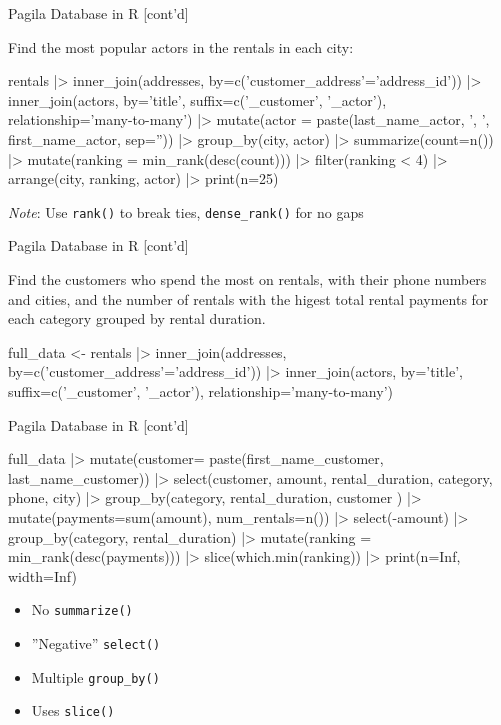 \documentclass[ignorenonframetext,xcolor=x11names]{beamer}
\begin{document}
\begin{frame}[label=full,fragile]{Pagila Database in R \small [cont'd]}

Find the most popular actors in the rentals in each city:

\scriptsize
\begin{Rcode}
rentals |> 
   inner_join(addresses,
       by=c('customer_address'='address_id')) |>
   inner_join(actors,
       by='title',
       suffix=c('_customer', '_actor'),
       relationship='many-to-many') |>
   mutate(actor = 
       paste(last_name_actor, ', ', 
       first_name_actor, sep='')) |>
   group_by(city, actor) |>
   summarize(count=n()) |>
   mutate(ranking = min_rank(desc(count))) |>
   filter(ranking < 4) |>
   arrange(city, ranking, actor) |>
   print(n=25)
\end{Rcode}

\normalsize
\emph{Note}: Use \texttt{rank()} to break ties, \texttt{dense\_rank()} for no gaps
\end{frame}

\begin{frame}[label=full,fragile]{Pagila Database in R \small [cont'd]}

Find the customers who spend the most on rentals, with their phone numbers and cities, and the number of rentals with the higest total rental payments for each category grouped by rental duration.

\footnotesize
\begin{Rcode}
full_data <- 
   rentals |> 
     inner_join(addresses,
       by=c('customer_address'='address_id')) |>
     inner_join(actors,
       by='title',
       suffix=c('_customer', '_actor'),
       relationship='many-to-many')
\end{Rcode}
\end{frame}

\begin{frame}[label=full,fragile]{Pagila Database in R \small [cont'd]}
\footnotesize
\begin{Rcode}
full_data |>
   mutate(customer=
     paste(first_name_customer, last_name_customer)) |>
   select(customer, amount, rental_duration, 
          category, phone, city) |>
   group_by(category, rental_duration, customer ) |>
   mutate(payments=sum(amount), num_rentals=n()) |>
   select(-amount) |>
   group_by(category, rental_duration) |>
   mutate(ranking = min_rank(desc(payments))) |>
   slice(which.min(ranking)) |>
   print(n=Inf, width=Inf)
\end{Rcode}
\normalsize

\begin{itemize}
  \item No \texttt{summarize()}
  \item ''Negative'' \texttt{select()}
  \item Multiple \texttt{group\_by()}
  \item Uses \texttt{slice()}
\end{itemize}
\end{frame}
\end{document}
